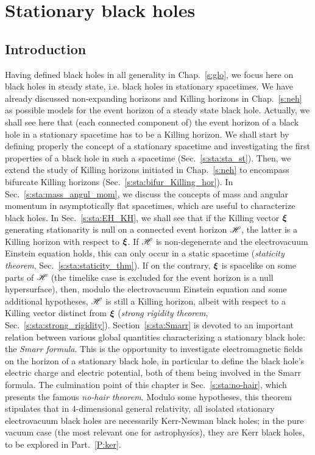 \chapter{Stationary black holes}
\label{s:sta}

\minitoc

\section{Introduction}

Having defined black holes in all generality in Chap.~\ref{s:glo}, we focus
here on black holes in steady state, i.e. black holes in stationary spacetimes.
We have already discussed
non-expanding horizons and Killing horizons in Chap.~\ref{s:neh} as
possible models for the event horizon of a
steady state black hole. Actually, we shall see here that (each connected
component of) the event horizon of a black hole in a stationary spacetime has to be
a Killing horizon.
We shall start by defining properly the concept of a stationary
spacetime and investigating the first properties of a black hole
in such a spacetime (Sec.~\ref{s:sta:sta_st}). Then, we extend the study of Killing horizons
initiated in Chap.~\ref{s:neh} to encompass bifurcate Killing horizons
(Sec.~\ref{s:sta:bifur_Killing_hor}). In Sec.~\ref{s:sta:mass_angul_mom},
we discuss the concepts
of mass and angular momentum in asymptotically flat spacetimes, which are useful to characterize black holes. In Sec.~\ref{s:sta:EH_KH}, we shall
see that
if the Killing vector $\bm{\xi}$ generating stationarity is null on
a connected event horizon $\mathscr{H}$, the latter is a Killing horizon with
respect to $\bm{\xi}$.  If $\mathscr{H}$ is non-degenerate and the
electrovacuum Einstein equation holds, this can only occur in a static spacetime
(\emph{staticity theorem}, Sec.~\ref{s:sta:staticity_thm}).
If on the contrary, $\bm{\xi}$ is spacelike on some parts of $\mathscr{H}$ (the timelike
case is excluded for the event horizon is a null hypersurface), then, modulo the
electrovacuum Einstein equation and some additional hypotheses,
$\mathscr{H}$ is still a Killing horizon, albeit with respect to a Killing vector
distinct from $\bm{\xi}$ (\emph{strong rigidity theorem}, Sec.~\ref{s:sta:strong_rigidity}).
Section~\ref{s:sta:Smarr} is devoted to an important relation between various global
quantities characterizing a stationary black hole: the \emph{Smarr formula}.
This is the opportunity to investigate electromagnetic
fields on the horizon of a stationary black hole, in particular to define
the black hole's electric charge and electric potential, both of them being involved
in the Smarr formula. The culmination point of this chapter is
Sec.~\ref{s:sta:no-hair}, which presents the famous
\emph{no-hair theorem}. Modulo some hypotheses, this theorem stipulates that in 4-dimensional
general relativity, all isolated stationary electrovacuum black holes are necessarily
Kerr-Newman black holes; in the pure vacuum case (the most relevant one for astrophysics),
they are Kerr black holes, to be explored in Part.~\ref{P:ker}.

